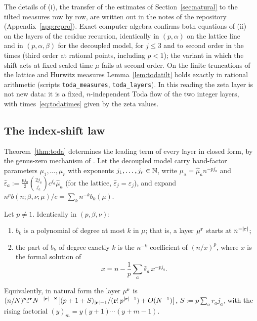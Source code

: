 The details of (i), the transfer of the estimates of Section~\ref{sec:natural} to the tilted measures row by row, are written out in the notes of the
repository (Appendix~\ref{app:repro}). Exact computer algebra confirms both equations of (ii) on the layers of the residue recursion,
identically in $(p,\alpha)$ on the lattice line and in $(p,\alpha,\beta)$ for the decoupled model, for $j\le3$ and to second order in
the times (third order at rational points, including $p<1$); the variant in which the shift acts at fixed scaled time $\mu$ fails at
second order. On the finite truncations of the lattice and Hurwitz measures Lemma~\ref{lem:todatilt} holds exactly in rational
arithmetic (scripts \texttt{toda\_measures}, \texttt{toda\_layers}). In this reading the zeta layer is not new data: it is a fixed, $n$-independent Toda flow of the two integer
layers, with times~\eqref{eq:todatimes} given by the zeta values.

\subsection{The index-shift law}\label{sec:indexshift}
Theorem~\ref{thm:toda} determines the leading term of every layer in closed form, by the genus-zero mechanism of \cite{Ercolani}. Let the decoupled model carry band-factor
parameters $\mu_1,\dots,\mu_r$ with exponents $j_1,\dots,j_r\in\mathbb{N}$, write $\mu_a=\hat\mu_an^{-pj_a}$ and
$\hat\varepsilon_a:=\frac{pj_a}2\binom{2j_a}{j_a}c^{j_a}\hat\mu_a$ (for the lattice, $\hat\varepsilon_j=\varepsilon_j$), and expand
$n^pb(n;\beta,\nu;\mu)/c=\sum_kn^{-k}b_k(\mu)$.

\begin{theorem}\label{thm:indexshift}
Let $p\ne1$. Identically in $(p,\beta,\nu)$:
\begin{enumerate}
\item[(i)] $b_k$ is a polynomial of degree at most $k$ in $\mu$; that is, a layer $\mu^{\mathbf r}$ starts at $n^{-|\mathbf r|}$;
\item[(ii)] the part of $b_k$ of degree exactly $k$ is the $n^{-k}$ coefficient of $(n/x)^p$, where $x$ is the formal solution of
\[
  x=n-\frac1p\sum_a\hat\varepsilon_a\,x^{-pj_a}.
\]
\end{enumerate}
Equivalently, in natural form the layer $\mu^{\mathbf r}$ is
$(n/N)^p\hat\varepsilon^{\mathbf r}N^{-|\mathbf r|-S}\bigl[(p+1+S)_{|\mathbf r|-1}/(\mathbf r!\,p^{|\mathbf r|-1})+O(N^{-1})\bigr]$, $S:=p\sum_ar_aj_a$, with the
rising factorial $(y)_m=y(y+1)\cdots(y+m-1)$.
\end{theorem}

